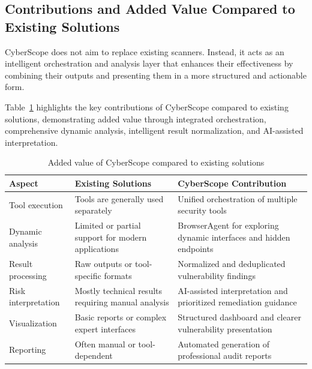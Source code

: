 \subsection{Contributions and Added Value Compared to Existing Solutions}

\indent CyberScope does not aim to replace existing scanners. Instead, it acts as an intelligent orchestration and analysis layer that enhances their effectiveness by combining their outputs and presenting them in a more structured and actionable form.

\vspace{0.5cm}
\indent Table~\ref{tab:cyberscope-value} highlights the key contributions of CyberScope compared to existing solutions, demonstrating added value through integrated orchestration, comprehensive dynamic analysis, intelligent result normalization, and AI-assisted interpretation.

\begin{table}[H]
    \centering
    \caption{Added value of CyberScope compared to existing solutions}
    \label{tab:cyberscope-value}
    \renewcommand{\arraystretch}{1.3}
    \begin{tabularx}{\textwidth}{|p{4cm}|X|X|}
        \hline
        \textbf{Aspect} & \textbf{Existing Solutions} & \textbf{CyberScope Contribution} \\
        \hline
        Tool execution & Tools are generally used separately & Unified orchestration of multiple security tools \\
        \hline
        Dynamic analysis & Limited or partial support for modern applications & BrowserAgent for exploring dynamic interfaces and hidden endpoints \\
        \hline
        Result processing & Raw outputs or tool-specific formats & Normalized and deduplicated vulnerability findings \\
        \hline
        Risk interpretation & Mostly technical results requiring manual analysis & AI-assisted interpretation and prioritized remediation guidance \\
        \hline
        Visualization & Basic reports or complex expert interfaces & Structured dashboard and clearer vulnerability presentation \\
        \hline
        Reporting & Often manual or tool-dependent & Automated generation of professional audit reports \\
        \hline
    \end{tabularx}
\end{table}


